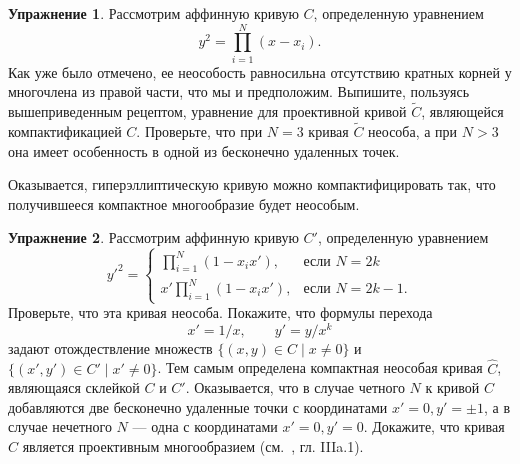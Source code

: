 \documentclass{article}
\theoremstyle{definition}
\theoremstyle{definition} %
\theoremstyle{remark}     %
\theoremstyle{definition}
\theoremstyle{definition}
\theoremstyle{definition}
\theoremstyle{definition}
\theoremstyle{definition}
\theoremstyle{definition}
\theoremstyle{definition}
\theoremstyle{definition}
\newtheorem{exercise}{Упражнение}[section]
\begin{document}
\begin{exercise}
  Рассмотрим аффинную кривую \( C \), определенную уравнением
  \[
    y^2 = \prod_{i=1}^N (x - x_i).
  \]
  Как уже было отмечено, ее неособость равносильна отсутствию кратных корней у многочлена из правой части, что мы и предположим. Выпишите, пользуясь вышеприведенным рецептом, уравнение для проективной кривой \( \tilde{C} \), являющейся компактификацией \( C \). Проверьте, что при \( N = 3 \) кривая \( \tilde{C} \) неособа, а при \( N > 3 \) она имеет особенность в одной из бесконечно удаленных точек.
\end{exercise}

Оказывается, гиперэллиптическую кривую можно компактифицировать так, что получившееся компактное многообразие будет неособым.

\begin{exercise}
  Рассмотрим аффинную кривую \( C' \), определенную уравнением
  \[
    y'^2 = 
    \begin{cases} 
      \prod_{i=1}^N (1 - x_i x'), & \text{если } N = 2k \\[4pt]
      x' \prod_{i=1}^N (1 - x_i x'), & \text{если } N = 2k - 1.
    \end{cases}
  \]
  Проверьте, что эта кривая неособа. Покажите, что формулы перехода
  \[
    x' = 1/x, \qquad y' = y/x^k
  \]
  задают отождествление множеств \( \{ (x, y) \in C \mid x \neq 0 \} \) и \( \{ (x', y') \in C' \mid x' \neq 0 \} \). Тем самым определена компактная неособая кривая \( \hat{C} \), являющаяся склейкой \( C \) и \( C' \). Оказывается, что в случае четного \( N \) к кривой \( C \) добавляются две бесконечно удаленные точки с координатами \( x' = 0, y' = \pm 1 \), а в случае нечетного \( N \) — одна с координатами \( x' = 0, y' = 0 \). Докажите, что кривая \( \hat{C} \) является проективным многообразием (см.~\cite{mumford1}, гл. IIIa.1).
\end{exercise}
\end{document}
